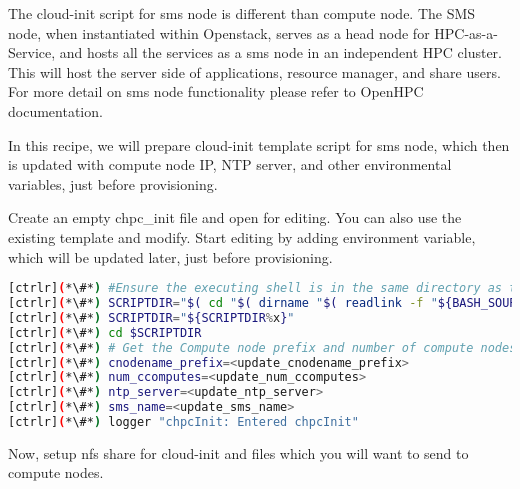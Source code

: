 	The cloud-init script for sms node is different than compute node. The SMS node, when instantiated within Openstack, serves as a head node for HPC-as-a-Service, and hosts all the services as a sms node in an independent HPC cluster. This will host the server side of applications, resource manager, and share users. For more detail on sms node functionality please refer to OpenHPC documentation.

	In this recipe, we will prepare cloud-init template script for sms node, which then is updated with compute node IP, NTP server, and other environmental variables, just before provisioning. 

	Create an empty chpc\_init file and open for editing. You can also use the existing template and modify. Start editing by adding environment variable, which will be updated later, just before provisioning.



\begin{lstlisting}[language=bash,keywords={}]
[ctrlr](*\#*) #Ensure the executing shell is in the same directory as the script.
[ctrlr](*\#*) SCRIPTDIR="$( cd "$( dirname "$( readlink -f "${BASH_SOURCE[0]}" )" )" && pwd -P && echo x)"
[ctrlr](*\#*) SCRIPTDIR="${SCRIPTDIR%x}"
[ctrlr](*\#*) cd $SCRIPTDIR
[ctrlr](*\#*) # Get the Compute node prefix and number of compute nodes
[ctrlr](*\#*) cnodename_prefix=<update_cnodename_prefix>
[ctrlr](*\#*) num_ccomputes=<update_num_ccomputes>
[ctrlr](*\#*) ntp_server=<update_ntp_server>
[ctrlr](*\#*) sms_name=<update_sms_name>
[ctrlr](*\#*) logger "chpcInit: Entered chpcInit"

\end{lstlisting} 

	Now, setup nfs share for cloud-init and files which you will want to send to compute nodes.


